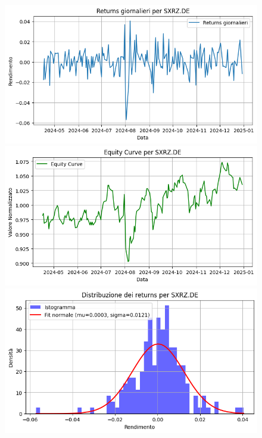 \documentclass{article}%
\begin{document}
\begin{figure}[htbp]%
\begin{minipage}{0.31\textwidth}%
\includegraphics[width=\linewidth]{immagini_tickers/SXRZ.DE_returns_plot.png}%
\end{minipage}%
\begin{minipage}{0.31\textwidth}%
\includegraphics[width=\linewidth]{immagini_tickers/SXRZ.DE_equity_curve.png}%
\end{minipage}%
\begin{minipage}{0.31\textwidth}%
\includegraphics[width=\linewidth]{immagini_tickers/SXRZ.DE_distribuzione_returns.png}%
\end{minipage}%
\end{figure}
\end{document}
